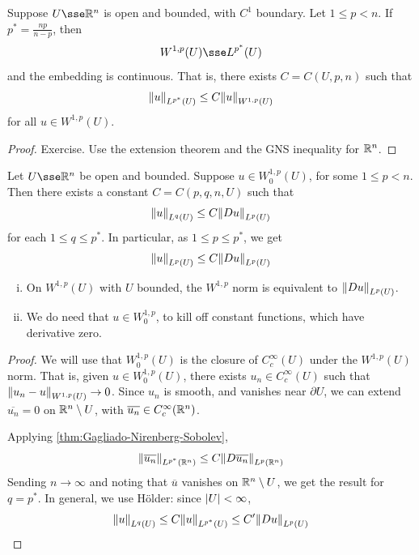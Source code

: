 \documentclass{article}
\begin{document}
\begin{corollary}
     Suppose \(U \sse \R^n\) is open and bounded, with \(C^1\) boundary. Let \(1 \le p < n\). If \(p^* = \frac{np}{n-p}\), then
    \[W^{1, p}(U) \sse L^{p^*}(U)\]
    and the embedding is continuous. That is, there exists \(C = C(U, p, n)\) such that
    \[\norm{u}_{L^{p^*}(U)} \le C\norm{u}_{W^{1, p}(U)}\]
    for all \(u \in W^{1, p}(U)\).
\end{corollary}

\begin{proof}
    Exercise. Use the extension theorem and the GNS inequality for \(\mathbb{R}^n\).
\end{proof}

\begin{corollary}
    Let \(U \sse \R^n\) be open and bounded. Suppose \(u \in W_0^{1, p}(U)\), for some \(1 \le p < n\). Then there exists a constant \(C = C(p, q, n, U)\) such that
    \[\norm{u}_{L^q(U)} \le C\norm{Du}_{L^p(U)}\]
    for each \(1 \le q \le p^*\). In particular, as \(1 \le p \le p^*\), we get
    \[\norm{u}_{L^p(U)} \le C\norm{Du}_{L^p(U)}\]
\end{corollary}

\begin{remark}
    \begin{enumerate}[(i)]
        \item On \(W^{1, p}(U)\) with \(U\) bounded, the \(W^{1, p}\) norm is equivalent to \(\norm{Du}_{L^p(U)}\).
        \item We do need that \(u \in W^{1, p}_0\), to kill off constant functions, which have derivative zero.
    \end{enumerate}
\end{remark}

\begin{proof}
    We will use that \(W^{1, p}_0(U)\) is the closure of \(C_c^\infty(U)\) under the \(W^{1, p}(U)\) norm. That is, given \(u \in W^{1, p}_0(U)\), there exists \(u_n \in C_c^\infty(U)\) such that \(\norm{u_n - u}_{W^{1, p}(U)} \to 0\). Since \(u_n\) is smooth, and vanishes near \(\partial U\), we can extend \(\overline{u_n} = 0\) on \(\mathbb{R}^n \setminus U\), with \(\overline{u_n} \in C_c^\infty(\mathbb{R}^n)\).

    Applying \cref{thm:Gagliado-Nirenberg-Sobolev},
    \[\norm{\overline{u_n}}_{L^{p^*}(\mathbb{R}^n)} \le C \norm{D\overline{u_n}}_{L^p(\mathbb{R}^n)}\]
    Sending \(n \to \infty\) and noting that \(\overline u\) vanishes on \(\mathbb{R}^n \setminus U\), we get the result for \(q = p^*\). In general, we use H\"older: since \(\abs{U} < \infty\),
    \[\norm{u}_{L^q(U)} \le C\norm{u}_{L^{p^*}(U)} \le C'\norm{Du}_{L^p(U)}\]  
\end{proof}
\end{document}
